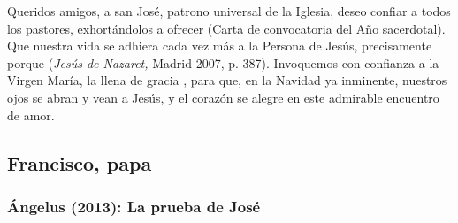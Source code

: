 \begin{body}
					Queridos amigos, a san José, patrono universal de la Iglesia, deseo confiar a todos los pastores, exhortándolos a ofrecer  (Carta de convocatoria del Año sacerdotal). Que nuestra vida se adhiera cada vez más a la Persona de Jesús, precisamente porque  (\emph{Jesús de Nazaret,} Madrid 2007, p. 387). Invoquemos con confianza a la Virgen María, la llena de gracia , para que, en la Navidad ya inminente, nuestros ojos se abran y vean a Jesús, y el corazón se alegre en este admirable encuentro de amor.
				\end{body}
			
	\newsection

		\subsection{Francisco, papa}

			\subsubsection{Ángelus (2013): La prueba de José}
			
				
